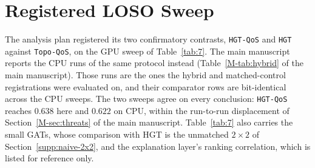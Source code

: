 \documentclass[preprint,3p]{elsarticle}
\begin{document}
\section{Registered LOSO Sweep}
\label{supp:loso-gpu}

The analysis plan registered its two confirmatory contrasts, \texttt{HGT-QoS} and \texttt{HGT} against \texttt{Topo-QoS}, on the GPU sweep of Table~\ref{tab:7}. The main manuscript reports the CPU runs of the same protocol instead (Table~\ref{M-tab:hybrid} of the main manuscript). Those runs are the ones the hybrid and matched-control registrations were evaluated on, and their comparator rows are bit-identical across the CPU sweeps. The two sweeps agree on every conclusion: \texttt{HGT-QoS} reaches $0.638$ here and $0.622$ on CPU, within the run-to-run displacement of Section~\ref{M-sec:threats} of the main manuscript. Table~\ref{tab:7} also carries the small GATs, whose comparison with HGT is the unmatched $2\times2$ of Section~\ref{supp:naive-2x2}, and the explanation layer's ranking correlation, which is listed for reference only.
\end{document}
